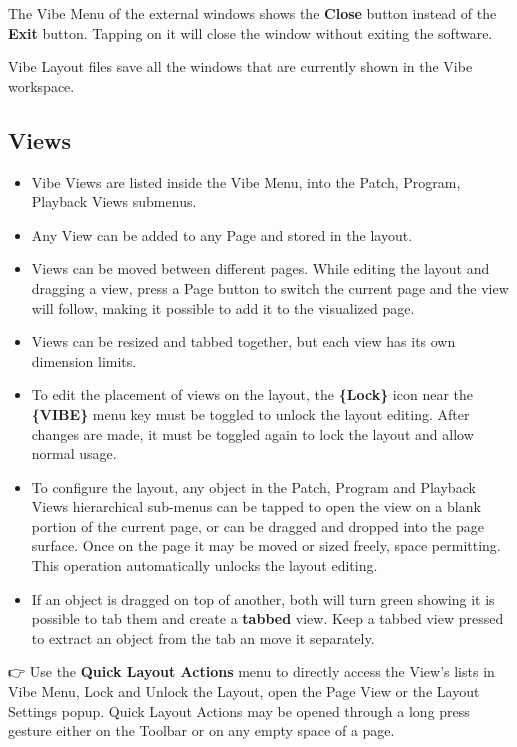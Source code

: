 \documentclass[
]{article}
\begin{document}
The Vibe Menu of the external windows shows the \textbf{Close} button instead of the \textbf{Exit} button. Tapping on it will close the window without exiting the software.

Vibe Layout files save all the windows that are currently shown in the Vibe workspace.

\hypertarget{Views-3.4}{%
\subsection{Views}\label{Views-3.4}}

\begin{itemize}
\item
  Vibe Views are listed inside the Vibe Menu, into the Patch, Program, Playback Views submenus.
\item
  Any View can be added to any Page and stored in the layout.
\item
  Views can be moved between different pages. While editing the layout and dragging a view, press a Page button to switch the current page and the view will follow, making it possible to add it to the visualized page.
\item
  Views can be resized and tabbed together, but each view has its own dimension limits.
\item
  To edit the placement of views on the layout, the \textbf{\{Lock\}} icon near the \textbf{\{VIBE\}} menu key must be toggled to unlock the layout editing. After changes are made, it must be toggled again to lock the layout and allow normal usage.
\item
  To configure the layout, any object in the Patch, Program and Playback Views hierarchical sub-menus can be tapped to open the view on a blank portion of the current page, or can be dragged and dropped into the page surface. Once on the page it may be moved or sized freely, space permitting. This operation automatically unlocks the layout editing.
\item
  If an object is dragged on top of another, both will turn green showing it is possible to tab them and create a \textbf{tabbed} view. Keep a tabbed view pressed to extract an object from the tab an move it separately.
\end{itemize}

👉 Use the \textbf{Quick Layout Actions} menu to directly access the View's lists in Vibe Menu, Lock and Unlock the Layout, open the Page View or the Layout Settings popup. Quick Layout Actions may be opened through a long press gesture either on the Toolbar or on any empty space of a page.
\end{document}

